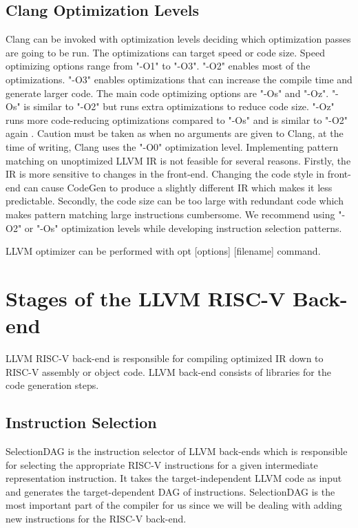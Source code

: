 \subsection{Clang Optimization Levels}

Clang can be invoked with optimization levels deciding which optimization passes are going to be run. The optimizations can target speed or code size. Speed optimizing options range from "-O1" to "-O3". "-O2" enables most of the optimizations. "-O3" enables optimizations that can increase the compile time and generate larger code. The main code optimizing options are "-Os" and "-Oz". "-Os" is similar to "-O2" but runs extra optimizations to reduce code size. "-Oz" runs more code-reducing optimizations compared to "-Os" and is similar to "-O2" again \cite{clangCommands}.
Caution must be taken as when no arguments are given to Clang, at the time of writing, Clang uses the "-O0" optimization level. Implementing pattern matching on unoptimized LLVM IR is not feasible for several reasons. Firstly, the IR is more sensitive to changes in the front-end. Changing the code style in front-end can cause CodeGen to produce a slightly different IR which makes it less predictable. Secondly, the code size can be too large with redundant code which makes pattern matching large instructions cumbersome. We recommend using "-O2" or "-Os" optimization levels while developing instruction selection patterns. 

LLVM optimizer can be performed with opt [options] [filename] command\cite{optimizer}.

\section{Stages of the LLVM RISC-V Back-end}
LLVM RISC-V back-end is responsible for compiling optimized IR down to RISC-V assembly or object code. LLVM back-end consists of libraries for the code generation steps\cite{llvmbackend}.

\subsection{Instruction Selection}
SelectionDAG is the instruction selector of LLVM back-ends which is responsible for selecting the appropriate RISC-V instructions for a given intermediate representation instruction. It takes the target-independent LLVM code as input and generates the target-dependent DAG of instructions. SelectionDAG is the most important part of the compiler for us since we will be dealing with adding new instructions for the RISC-V back-end. 


